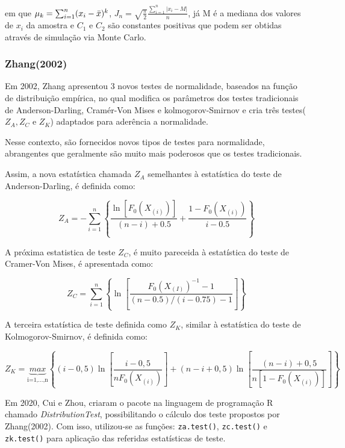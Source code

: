 \documentclass[a4paper,11pt]{article} %
\begin{document}
em que $\mu_{k} = \sum_{i=1}^{n} (x_{i}- \Bar{x})^{k}$, $J_{n} = \sqrt{\frac{\pi}{2}}\frac{\sum_{i=1}^{n}|x_{i}-M|}{n}$, já M é a mediana dos valores de $x_{i}$ da amostra e $C_{1}$ e $C_{2}$ são constantes positivas que podem ser obtidas através de simulação via Monte Carlo. \vskip0.3cm

\subsubsection{Zhang(2002)}

Em 2002, Zhang apresentou 3 novos testes de normalidade, baseados na função de distribuição empírica, no qual modifica os parâmetros dos testes tradicionais de Anderson-Darling, Cramér-Von Mises e kolmogorov-Smirnov e cria três testes($Z_{A}, Z_{C}$ e $Z_{K}$) adaptados para aderência a normalidade.\vskip0.3cm

Nesse contexto, são fornecidos novos tipos de testes para normalidade, abrangentes que geralmente são muito mais poderosos que os testes tradicionais. \vskip0.3cm

Assim, a nova estatística chamada $Z_{A}$ semelhantes à estatística do teste de Anderson-Darling, é definida como:

\begin{equation}
    Z_{A} = - \sum_{i=1}^{n} \left\{  \frac{ \ln[F_{0}(X_{(i)})]}{(n-i)+0.5} + \frac{1-F_{0}(X_{(i)})}{i-0.5}  \right\}  
\end{equation}

A próxima estatistica de teste $Z_{C}$, é muito pareceida à estatística do teste de Cramer-Von Mises, é apresentada como:

\begin{equation}
    Z_{C} = \sum_{i=1}^{n}  \left\{ \ln\left[ \frac{F_{0}(X_{(I)})^{-1}-1}{(n-0.5)/(i-0.75)-1} \right] \right\}
\end{equation}

A terceira estatística de teste definida como $Z_{K}$, similar à estatística do teste de Kolmogorov-Smirnov, é definida como:

\begin{equation}
Z_{K} = \underbrace{max}_{\mbox{i=1,...,n}} \left\{(i - 0,5) \ln\left[ \frac{i - 0,5}{n F_{0}(X_{(i)})} \right] + (n - i + 0,5) \ln\left[ \dfrac{(n - i) + 0,5}{n[1 - F_{0}(X_{(i)})]} \right] \right\}
\end{equation}

Em 2020, Cui e Zhou, criaram o pacote na linguagem de programação R chamado \textit{DistributionTest}, possibilitando o cálculo dos teste propostos por Zhang(2002). Com isso,  utilizou-se as funções: \texttt{za.test()}, \texttt{zc.test()} e \texttt{zk.test()} para aplicação das referidas estatísticas de teste. \vskip0.3cm
\end{document}
